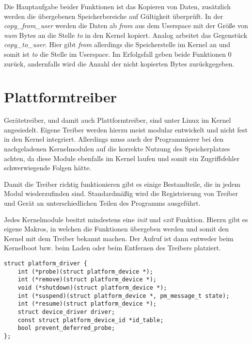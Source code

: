 Die Hauptaufgabe beider Funktionen ist das Kopieren von Daten, zusätzlich werden die übergebenen Speicherbereiche auf Gültigkeit überprüft. 
In der \textit{copy\_from\_user} werden die Daten ab \textit{from} aus dem Userspace mit der Größe von \textit{num} Bytes an die Stelle \textit{to} in den Kernel kopiert.
Analog arbeitet das Gegenstück \textit{copy\_to\_user}. Hier gibt \textit{from} allerdings die Speicherstelle im Kernel an und somit ist \textit{to} die Stelle im Userspace.
Im Erfolgsfall geben beide Funktionen 0 zurück, andernfalls wird die Anzahl der nicht kopierten Bytes zurückgegeben. \citep[S. 250f]{schroder2009embedded}

\section{Plattformtreiber}\label{sec:plat_t}
Gerätetreiber, und damit auch Plattformtreiber, sind unter Linux im Kernel angesiedelt. Eigene Treiber werden hierzu meist modular entwickelt und nicht fest in den Kernel integriert. Allerdings muss auch der Programmierer bei den nachgeladenen Kernelmodulen auf die korrekte Nutzung des Speicherplatzes achten, da diese Module ebenfalls im Kernel laufen und somit ein Zugriffsfehler schwerwiegende Folgen hätte. \citep[S. 231ff]{schroder2009embedded}

Damit die Treiber richtig funktionieren gibt es einige Bestandteile, die in jedem Modul wiederzufinden sind. Standardmäßig wird die Registrierung von Treiber und Gerät an unterschiedlichen Teilen des Programms ausgeführt. \cite{corbetplatform} 




Jedes Kernelmodule besitzt mindestens eine \textit{init} und \textit{exit} Funktion. Hierzu gibt es eigene Makros, in welchen die Funktionen übergeben werden und somit den Kernel mit dem Treiber bekannt machen. Der Aufruf ist dann entweder beim Kernelboot bzw. beim Laden oder beim Entfernen des Treibers platziert. \cite[linux/module.h]{linuxsourceinclude}

\begin{lstfloat}
\begin{lstlisting}
struct platform_driver {
	int (*probe)(struct platform_device *);
	int (*remove)(struct platform_device *);
	void (*shutdown)(struct platform_device *);
	int (*suspend)(struct platform_device *, pm_message_t state);
	int (*resume)(struct platform_device *);
	struct device_driver driver;
	const struct platform_device_id *id_table;
	bool prevent_deferred_probe;
};
\end{lstlisting}
\end{lstfloat}

